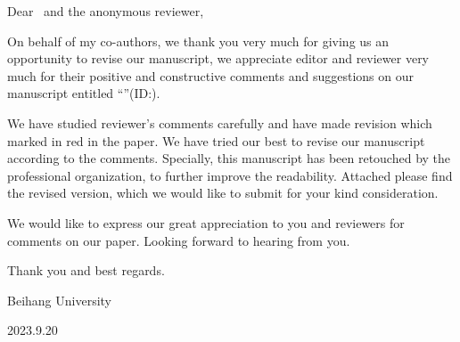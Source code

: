 \noindent Dear \editorname \, and the anonymous reviewer,

On behalf of my co-authors, we thank you very much for giving us an opportunity to revise our manuscript, we appreciate editor and reviewer very much for their positive and constructive comments and suggestions on our manuscript entitled \enquote{\thetitle}(ID:\manuscript).

We have studied reviewer's comments carefully and have made revision which marked in red in the paper. We have tried our best to revise our manuscript according to the comments. Specially, this manuscript has been retouched by the professional organization, to further improve the readability. Attached please find the revised version, which we would like to submit for your kind consideration.

We would like to express our great appreciation to you and reviewers for comments on our paper. Looking forward to hearing from you.

Thank you and best regards.

\begin{flushright}
\theauthor

Beihang University

2023.9.20
\end{flushright}